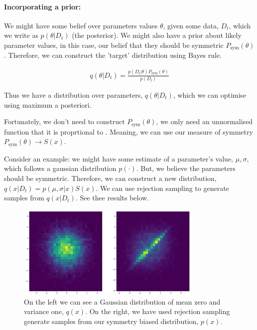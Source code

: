 \paragraph{Incorporating a prior:} We might have some belief over parameters values $\theta$, given some data, $D_t$, which we write as $p(\theta| D_t)$ (the posterior).
We might also have a prior about likely parameter values, in this case, our belief that they should be symmetric $P_{\text{sym}}(\theta)$. Therefore, we can construct the 'target' distribution using Bayes rule.

\begin{align*}
q(\theta | D_t) = \frac{p(D_t | \theta)P_{\text{sym}}(\theta)}{p(D_t)}
\end{align*}

Thus we have a distribution over parameters, $q(\theta | D_t)$, which we can optimise using maximum a posteriori.

Fortunately, we don't need to construct $P_{\text{sym}}(\theta)$, we only need an unnormalised function that it is proprtional to \cite{Owen2013}. Meaning, we can use our measure of symmetry $P_{\text{sym}}(\theta)\to S(x)$.

Consider an example: we might have some estimate of a parameter's value, $\mu, \sigma$, which follows a gaussian distribution $p(\cdot)$. But, we believe the parameters should be symmetric. Therefore, we can construct a new distribution, $q(x | D_t) = p(\mu, \sigma| x)S(x)$. We can use rejection sampling to generate samples from $q(x | D_t)$. See thee results below.


\begin{figure}[h!]
  \centering
  \includegraphics[width=0.8\textwidth,height=0.175\textheight]{../../pictures/figures/symmetric-gaussian.png}
  \caption{On the left we can see a Gaussian distribution of mean zero and variance one, $q(x)$.
  On the right, we have used rejection sampling generate samples from our symmetry biased distribution, $p(x)$.}
\end{figure}

